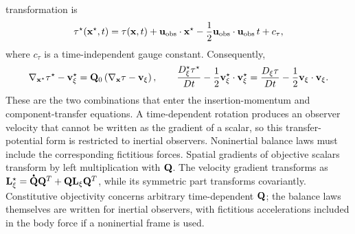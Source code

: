 transformation is
%
\begin{equation}
	\tau^\star(\mathbf{x}^\star,t)
	=
	\tau(\mathbf{x},t)
	+
	\mathbf{u}_{\rm obs}\cdot\mathbf{x}^\star
	-
	\frac{1}{2}
	\mathbf{u}_{\rm obs}\cdot\mathbf{u}_{\rm obs}\,t
	+
	c_\tau,
	\label{eq:transfer_potential_galilean_rule}
\end{equation}
%
where \(c_\tau\) is a time-independent gauge constant.  Consequently,
%
\begin{equation}
	\nabla_{\mathbf{x}^\star}\tau^\star-\mathbf{v}_\xi^\star
	=
	\mathbf{Q}_0
	\left(
	\nabla_{\mathbf{x}}\tau-\mathbf{v}_\xi
	\right),
	\qquad
	\frac{D_\xi^\star\tau^\star}{Dt}
	-
	\frac{1}{2}
	\mathbf{v}_\xi^\star\cdot\mathbf{v}_\xi^\star
	=
	\frac{D_\xi\tau}{Dt}
	-
	\frac{1}{2}
	\mathbf{v}_\xi\cdot\mathbf{v}_\xi .
	\label{eq:transfer_potential_galilean_invariants}
\end{equation}
%
These are the two combinations that enter the insertion-momentum and
component-transfer equations.  A time-dependent rotation produces an observer
velocity that cannot be written as the gradient of a scalar, so this
transfer-potential form is restricted to inertial observers.  Noninertial
balance laws must include the corresponding fictitious forces.
Spatial gradients of objective scalars transform by left multiplication with
\(\mathbf{Q}\).  The velocity gradient transforms as
\(\mbf L_\xi^\star=\phasedot{\mbf Q}\mbf Q^T+
\mbf Q\mbf L_\xi\mbf Q^T\), while its symmetric part transforms
covariantly.  Constitutive objectivity concerns arbitrary time-dependent
\(\mathbf{Q}\); the balance laws themselves are written for inertial observers,
with fictitious accelerations included in the body force if a noninertial frame
is used.

